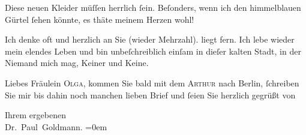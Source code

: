\pstart
           Diese neuen Kleider müſſen herrlich{ }ſein. Beſonders, wenn ich den himmelblauen
               Gürtel{ }ſehen könnte, es thäte meinem Herzen wohl!\pend
           
\pstart
           Ich denke oft und herzlich an Sie (wieder Mehrzahl). \label{K_L03086-8v}\label{K_L03086-8} liegt fern. Ich lebe wieder mein elendes Leben und bin unbeſchreiblich einſam
               in dieſer kalten Stadt, in der
               Niemand mich mag, Keiner und Keine.\pend
           
\pstart
           {\pb}Liebes Fräulein \textsc{Olga},
               kommen Sie bald mit dem \textsc{Arthur} nach Berlin,{ }ſchreiben Sie mir bis dahin noch manchen lieben Brief
               und{ }ſeien Sie herzlich gegrüßt von\pend
           
\pstart
           Ihrem ergebenen{\\[\baselineskip]}\spacefill\mbox{Dr. Paul Goldmann.}\pend
           \leftskip=0em{}\endnumbering{}  \newcommand{\dateiname}{L03086}\newcommand{\titel}{Paul Goldmann an Arthur Schnitzler, Olga und Elisabeth Gussmann, 27. 9. [1901]}\newcommand{\editorInnen}{Martin Anton Müller und Laura Untner}
